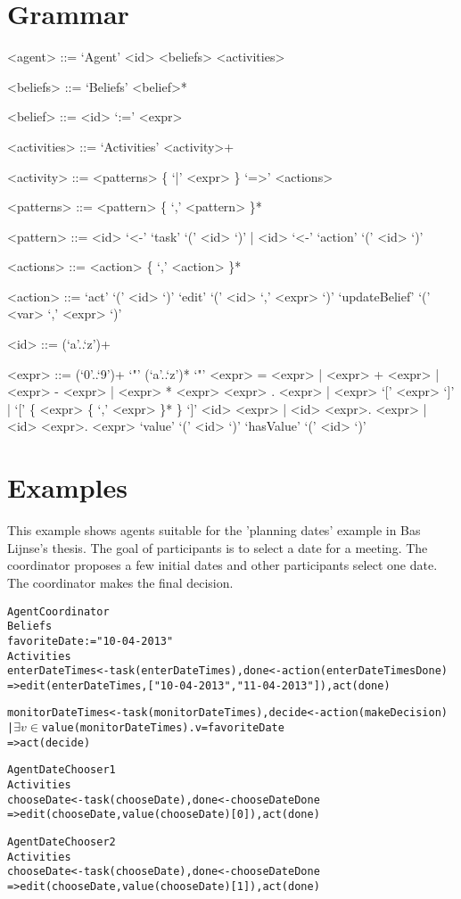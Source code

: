 \section{Grammar}

\begin{grammar}
<agent> ::= `Agent' <id> <beliefs> <activities>

<beliefs> ::= `Beliefs' <belief>*

<belief> ::= <id> `:=' <expr>

<activities>  ::= `Activities' <activity>+

<activity> ::= <patterns> \{ `|' <expr> \} `=>' <actions>

<patterns> ::= <pattern> \{ `,' <pattern> \}*

<pattern> ::= <id> `<-' `task' `(' <id> `)' | <id> `<-' `action' `(' <id> `)'

<actions> ::= <action> \{ `,' <action> \}*

<action> ::= `act' `(' <id> `)'
\alt `edit' `(' <id> `,' <expr> `)'
\alt `updateBelief' `(' <var> `,' <expr> `)'

<id> ::= (`a'..`z')+

<expr> ::= (`0'..`9')+
\alt `"' (`a'..`z')* `"'
\alt <expr> = <expr> | <expr> + <expr> | <expr> - <expr> | <expr> * <expr>
\alt <expr> . <expr> | <expr> `[' <expr> `]' | `[' \{ <expr> \{ `,' <expr> \}* \} `]'
\alt <id>
\alt \lit{$\lnot$} <expr> | \lit{$\exists$} <id> \lit{$\in$} <expr>. <expr> | \lit{$\forall$} <id> \lit{$\in$} <expr>. <expr>
\alt `value' `(' <id> `)'
\alt `hasValue' `(' <id> `)' 
\end{grammar}

\section{Examples}

This example shows agents suitable for the 'planning dates' example in Bas Lijnse's thesis. The goal of participants is to select a date for a meeting. The coordinator proposes a few initial dates and other participants select one date. The coordinator makes the final decision.

\begin{alltt}
Agent Coordinator
Beliefs
    favoriteDate := "10-04-2013"
Activities
    enterDateTimes <- task(enterDateTimes), done <- action(enterDateTimesDone)
    => edit(enterDateTimes, ["10-04-2013", "11-04-2013"]), act(done)
	
    monitorDateTimes <- task(monitorDateTimes), decide <- action(makeDecision)
    | \(\exists v \in\) value(monitorDateTimes). v = favoriteDate
    => act(decide)
    
Agent DateChooser1
Activities
    chooseDate <- task(chooseDate), done <- chooseDateDone
    => edit(chooseDate, value(chooseDate)[0]), act(done)
    
Agent DateChooser2
Activities
    chooseDate <- task(chooseDate), done <- chooseDateDone
    => edit(chooseDate, value(chooseDate)[1]), act(done)
\end{alltt}

